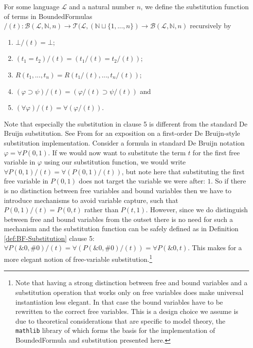 \begin{definition}\label{def:BF-Substitution}
\leanok
{}
For some language $\mathcal{L}$ and a natural number $n$, we define the substitution function of terms in BoundedFormulas $/(t) : \mathcal{B}(\mathcal{L},\mathbb{N},n) \to \mathcal{T}(\mathcal{L},(\mathbb{N} \sqcup \{1,...,n\}) \to \mathcal{B}(\mathcal{L},\mathbb{N},n)$ recursively by
\begin{enumerate}
\item $\bot/(t) = \bot$;
\item $(t_1 = t_2)/(t) = (t_1/(t) = t_2/(t))$;
\item $R(t_1,...,t_n) = R(t_1/(t),...,t_n/(t))$;
\item $(\varphi \supset \psi)/(t) = (\varphi/(t) \supset \psi/(t))$ and
\item $(\forall \varphi)/(t) = \forall (\varphi/(t))$.
\end{enumerate}
\end{definition}

Note that especially the substitution in clause 5 is different from the standard De Bruijn substitution. See From \cite{from:2021} for an exposition on a first-order De Bruijn-style substitution implementation. Consider a formula in standard De Bruijn notation $\varphi = \forall P(0,1)$. If we would now want to substitute the term $t$ for the first free variable in $\varphi$ using our substitution function, we would write $\forall P(0,1)/(t) = \forall (P(0,1)/(t))$, but note here that substituting the first free variable in $P(0,1)$ does not target the variable we were after: $1$. So if there is no distinction between free variables and bound variables then we have to introduce mechanisms to avoid variable capture, such that $P(0,1)/(t) = P(0,t)$ rather than $P(t,1)$. However, since we do distinguish between free and bound variables from the outset there is no need for such a mechanism and the substitution function can be safely defined as in Definition \ref{def:BF-Substitution} clause 5: $\forall P(\&0,\#0)/(t) = \forall (P(\&0,\#0)/(t)) = \forall P(\&0,t)$. This makes for a more elegant notion of free-variable substitution.\footnote{Note that having a strong distinction between free and bound variables and a substitution operation that works only on free variables does make universal instantiation less elegant. In that case the bound variables have to be rewritten to the correct free variables. This is a design choice we assume is due to theoretical considerations that are specific to model theory, the \texttt{mathlib} library of which forms the basis for the implementation of BoundedFormula and substitution presented here.}

